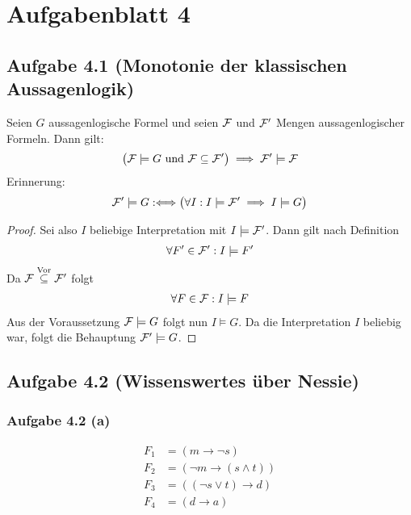
\section{Aufgabenblatt 4}
\subsection{Aufgabe 4.1 (Monotonie der klassischen Aussagenlogik)}
Seien $G$ aussagenlogische Formel und seien $\mathcal{F}$ und $\mathcal{F}'$
Mengen aussagenlogischer Formeln. 
Dann gilt:
\begin{align*}
	\big(\mathcal{F}\models G\text{ und } \mathcal{F}\subseteq\mathcal{F}'\big)\implies\mathcal{F}'\models\mathcal{F}
\end{align*}
Erinnerung:
\begin{align*}
	\mathcal{F}'\models G:\Longleftrightarrow\big(\forall I:I\models\mathcal{F}'\implies I\models G\big)
\end{align*}

\begin{proof}
	Sei also $I$ beliebige Interpretation mit $I\models\mathcal{F}'$. 
	Dann gilt nach Definition
	\begin{align*}
		\forall F'\in\mathcal{F}':I\models F'
	\end{align*}
	Da $\mathcal{F}\stackrel{\text{Vor}}{\subseteq}\mathcal{F}'$ folgt 
	\begin{align*}
		\forall F\in\mathcal{F}:I\models F
	\end{align*}
	Aus der Voraussetzung $\mathcal{F}\models G$ folgt nun $I\models G$. 
	Da die Interpretation $I$ beliebig war, folgt die Behauptung $\mathcal{F}'\models G$. 
\end{proof}

\subsection{Aufgabe 4.2  (Wissenswertes über Nessie)}
\subsubsection{Aufgabe 4.2 (a)}
\begin{align*}
	F_1 &=(m \to\neg s)\\
	F_2 &=(\neg m\to (s\wedge t))\\
	F_3&=((\neg s\vee t)\to d)\\
	F_4&=(d\to a)
\end{align*}

